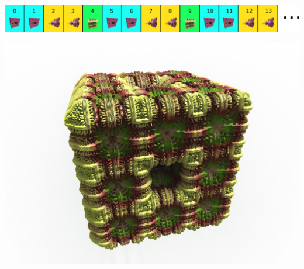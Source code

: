 \includegraphics[width=\linewidth]{img/manual/media/iteration_loop_hybrid_sequence_5.png}

\includegraphics[width=0.7\linewidth]{img/manual/media/hybrid_sequence_example_5.png}
